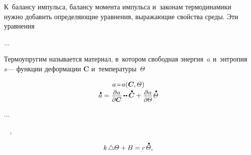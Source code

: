 \label{para:constitutiveequations.thermoelasticity}

\begin{otherlanguage}{russian}

К~балансу импульса, балансу момента импульса и~законам термодинамики нужно добавить определяющие уравнения, выражающие свойства среды. Эти уравнения

...

Термоупругим называется материал, в~котором свободная энергия~$a$ и~энтропия~$s$\:--- функции деформации $\bm{C}$ и~температуры~$\temperaturefield$

\nopagebreak\vspace{-0.1em}\begin{equation*}\begin{array}{c}
a \narroweq a(\bm{C} \hspace{-0.1ex} , \temperaturefield)
\\[.2em]
%
\mathdotabove{a}
= \scalebox{0.92}[0.92]{$ \displaystyle \frac{\raisemath{-0.2em}{\partial\hspace{.1ex} a}}{\partial \bm{C}}$}
\hspace{-0.15ex} \dotdotp \hspace{-0.1ex} \mathdotabove{\bm{C}}
+ \scalebox{0.92}[0.92]{$ \displaystyle \frac{\raisemath{-0.2em}{\partial\hspace{.1ex} a}}{\partial \temperaturefield}$}
\hspace{.2ex} \mathdotabove{\temperaturefield}
\end{array}\end{equation*}

...

\end{otherlanguage}



\label{para:heatequation}

~
,

\nopagebreak\en{\vspace{-0.15em}}\ru{\vspace{-0.88em}}\begin{equation}\label{heatequation:mathematicalphysics}
k \hspace{-0.1ex} \Laplacian \temperaturefield + \hspace{-0.1ex} B = c \hspace{.33ex} \mathdotabove{\temperaturefield} ,
\end{equation}

